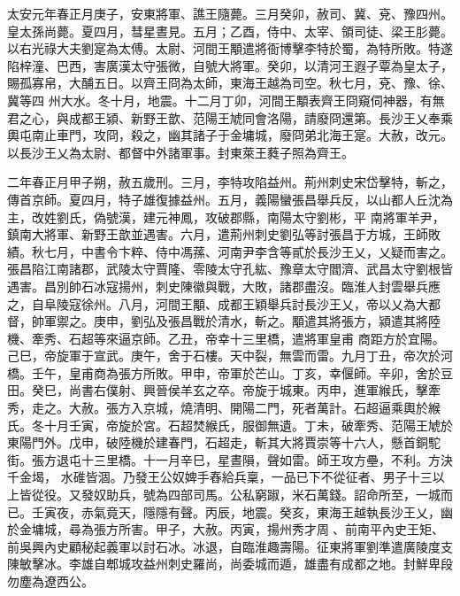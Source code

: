 \begin{pinyinscope}
 太安元年春正月庚子，安東將軍、譙王隨薨。三月癸卯，赦司、冀、兗、豫四州。皇太孫尚薨。夏四月，彗星晝見。五月；乙酉，侍中、太宰、領司徒、梁王肜薨。以右光祿大夫劉寔為太傅。太尉、河間王顒遣將衙博擊李特於蜀，為特所敗。特遂陷梓潼、巴西，害廣漢太守張微，自號大將軍。癸卯，以清河王遐子覃為皇太子，賜孤寡帛，大酺五日。以齊王冏為太師，東海王越為司空。秋七月，兗、豫、徐、冀等四
 州大水。冬十月，地震。十二月丁卯，河間王顒表齊王冏窺伺神器，有無君之心，與成都王潁、新野王歆、范陽王虓同會洛陽，請廢冏還第。長沙王乂奉乘輿屯南止車門，攻冏，殺之，幽其諸子于金墉城，廢冏弟北海王寔。大赦，改元。以長沙王乂為太尉、都督中外諸軍事。封東萊王蕤子照為齊王。



 二年春正月甲子朔，赦五歲刑。三月，李特攻陷益州。荊州刺史宋岱擊特，斬之，傳首京師。夏四月，特子雄復據益州。五月，義陽蠻張昌舉兵反，以山都人丘沈為主，改姓劉氏，偽號漢，建元神鳳，攻破郡縣，南陽太守劉彬，平
 南將軍羊尹，鎮南大將軍、新野王歆並遇害。六月，遣荊州刺史劉弘等討張昌于方城，王師敗績。秋七月，中書令卞粹、侍中馮蓀、河南尹李含等貳於長沙王乂，乂疑而害之。張昌陷江南諸郡，武陵太守賈隆、零陵太守孔紘、豫章太守閻濟、武昌太守劉根皆遇害。昌別帥石冰寇揚州，刺史陳徽與戰，大敗，諸郡盡沒。臨淮人封雲舉兵應之，自阜陵寇徐州。八月，河間王顒、成都王穎舉兵討長沙王乂，帝以乂為大都督，帥軍禦之。庚申，劉弘及張昌戰於清水，斬之。顒遣其將張方，潁遣其將陸機、牽秀、石超等來逼京師。乙丑，帝幸十三里橋，遣將軍皇甫
 商距方於宜陽。己巳，帝旋軍于宣武。庚午，舍于石樓。天中裂，無雲而雷。九月丁丑，帝次於河橋。壬午，皇甫商為張方所敗。甲申，帝軍於芒山。丁亥，幸偃師。辛卯，舍於豆田。癸巳，尚書右僕射、興晉侯羊玄之卒。帝旋于城東。丙申，進軍緱氏，擊牽秀，走之。大赦。張方入京城，燒清明、開陽二門，死者萬計。石超逼乘輿於緱氏。冬十月壬寅，帝旋於宮。石超焚緱氏，服御無遺。丁未，破牽秀、范陽王虓於東陽門外。戊申，破陸機於建春門，石超走，斬其大將賈崇等十六人，懸首銅駝街。張方退屯十三里橋。十一月辛巳，星晝隕，聲如雷。師王攻方壘，不利。方決千金堨，
 水碓皆涸。乃發王公奴婢手舂給兵稟，一品已下不從征者、男子十三以上皆從役。又發奴助兵，號為四部司馬。公私窮踧，米石萬錢。詔命所至，一城而已。壬寅夜，赤氣竟天，隱隱有聲。丙辰，地震。癸亥，東海王越執長沙王乂，幽於金墉城，尋為張方所害。甲子，大赦。丙寅，揚州秀才周、前南平內史王矩、前吳興內史顧秘起義軍以討石冰。冰退，自臨淮趣壽陽。征東將軍劉準遣廣陵度支陳敏擊冰。李雄自郫城攻益州刺史羅尚，尚委城而遁，雄盡有成都之地。封鮮卑段勿塵為遼西公。




\end{pinyinscope}
